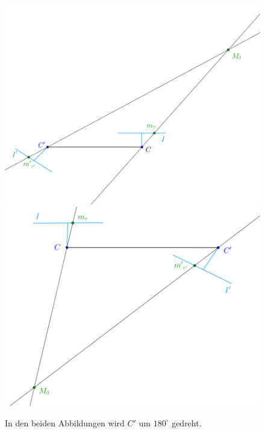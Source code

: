 \begin{figure}[!htb]
	\includegraphics[width=\linewidth]{images/P_Solution_three.png}
	\endminipage\hfill
	\includegraphics[width=\linewidth]{images/P_Solution_four.png}
	\endminipage\hfill
	\caption[Bestimmung extrinsischer Kameraparameter: Lösung drei und vier]{In den beiden Abbildungen wird $C'$ um $180^\circ$ gedreht.}
	\label{fig:T_2}
\end{figure}
\pagebreak



